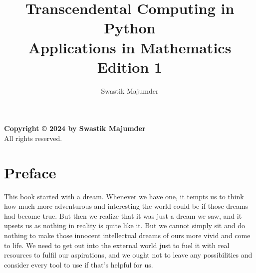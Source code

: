 \documentclass{book}
\title{Transcendental Computing in Python\\ Applications in Mathematics\\ Edition 1}
\author{Swastik Majumder}
\date{} %
\begin{document}
\lstset{basicstyle=\footnotesize\ttfamily}
\frontmatter %

\maketitle
\newpage
\vspace*{\fill}
\begin{center}
    \textbf{Copyright © 2024 by Swastik Majumder}\\
    All rights reserved.
\end{center}
\vspace*{\fill}
\newpage
\thispagestyle{empty} %


\tableofcontents %

\mainmatter %

\pagestyle{empty}


\chapter*{Preface}

This book started with a dream. Whenever we have one, it tempts us to think how much more adventurous and interesting the world could be if those dreams had become true. But then we realize that it was just a dream we saw, and it upsets us as nothing in reality is quite like it. But we cannot simply sit and do nothing to make those innocent intellectual dreams of ours more vivid and come to life. We need to get out into the external world just to fuel it with real resources to fulfil our aspirations, and we ought not to leave any possibilities and consider every tool to use if that's helpful for us.
\end{document}
